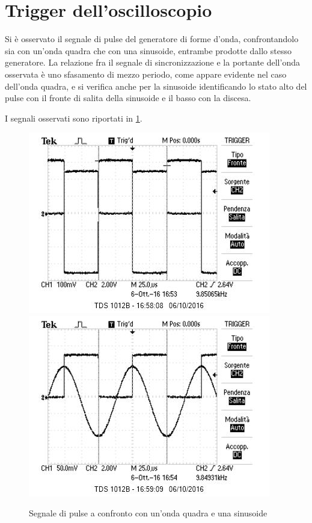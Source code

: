 \documentclass[10pt,a4paper]{article}
\begin{document}
\section{Trigger dell'oscilloscopio}
Si è osservato il segnale di pulse del generatore di forme d'onda, confrontandolo sia con un'onda quadra che con una sinusoide, entrambe prodotte dallo stesso generatore.
La relazione fra il segnale di sincronizzazione e la portante dell'onda osservata è uno sfasamento di mezzo periodo, come appare evidente nel caso dell'onda quadra, e si verifica anche per la sinusoide identificando lo stato alto del pulse con il fronte di salita della sinusoide e il basso con la discesa.

I segnali osservati sono riportati in \figurename{\ref{f:pulse}}.

\begin{figure}[h]
	\centering
	\includegraphics[scale=0.6]{../Oscilloscopio/trig_pulse_square.jpg}
	\includegraphics[scale=0.6]{../Oscilloscopio/trig_pulse_sin.jpg}
	\caption{Segnale di pulse a confronto con un'onda quadra e una sinusoide}
	\label{f:pulse}
\end{figure}
\end{document}
